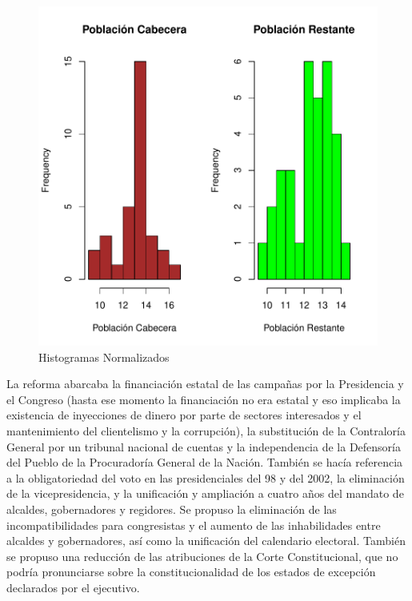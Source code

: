 \documentclass{article}
\begin{document}
\begin{figure}[h]
\centering
\includegraphics{proyecto1-histnorm}
\caption{Histogramas Normalizados}
\label{histor}
\end{figure}

La reforma abarcaba la financiación estatal de las campañas por la Presidencia y el Congreso (hasta ese momento la financiación no era estatal y eso implicaba la existencia de inyecciones de dinero por parte de sectores interesados y el mantenimiento del clientelismo y la corrupción), la substitución de la Contraloría General por un tribunal nacional de cuentas y la independencia de la Defensoría del Pueblo de la Procuradoría General de la Nación. También se hacía referencia a la obligatoriedad del voto en las presidenciales del 98 y del 2002, la eliminación de la vicepresidencia, y la unificación y ampliación a cuatro años del mandato de alcaldes, gobernadores y regidores\cite{gower_general_1971}. Se propuso la eliminación de las incompatibilidades para congresistas y el aumento de las inhabilidades entre alcaldes y gobernadores, así como la unificación del calendario electoral. También se propuso una reducción de las atribuciones de la Corte Constitucional, que no podría pronunciarse sobre la constitucionalidad de los estados de excepción declarados por el ejecutivo. 
\end{document}
